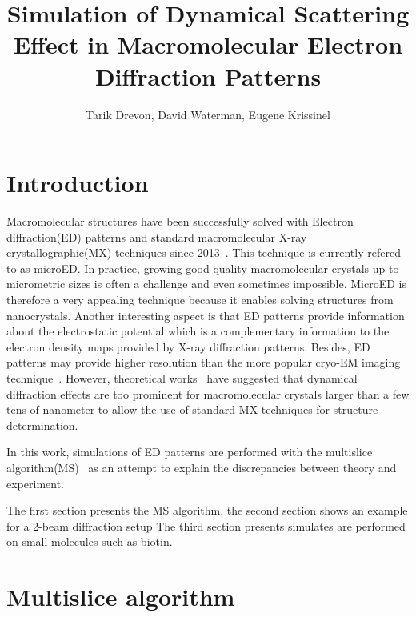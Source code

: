 \documentclass[a4paper,10pt]{article}
\begin{document}
\title{Simulation of Dynamical Scattering Effect in Macromolecular Electron Diffraction Patterns}
\author{Tarik Drevon, David Waterman, Eugene Krissinel}

\maketitle
{}
\tableofcontents




\section{Introduction}
Macromolecular structures have been successfully solved with
Electron diffraction(ED) patterns and standard macromolecular X-ray crystallographic(MX) techniques since 2013~\cite{ShiNanenga2016,ClabbersGrueneAbrahams2017}.
This technique is currently refered to as microED.
In practice, growing good quality macromolecular crystals up to micrometric sizes is often a challenge and even sometimes impossible.
MicroED is therefore a very appealing technique because it enables solving structures from nanocrystals. Another interesting aspect is that ED patterns provide information about the electrostatic potential which is a complementary information to the electron density maps provided by X-ray diffraction patterns. Besides, ED patterns may provide higher resolution than the more popular cryo-EM imaging technique~\cite{Latychevskaia2019}.
However, theoretical works~\cite{GlaeserDowning1993,SubramanianSpence2015} have suggested that dynamical diffraction effects are too prominent for macromolecular crystals larger than a few tens of nanometer to allow the use of standard MX techniques for structure determination.

In this work, simulations of ED patterns are performed with the multislice algorithm(MS)~\cite{CowleyMoodie1957,Ishizuka2004,Kirkland2019} as an
attempt to explain the discrepancies between theory and experiment.

The first section presents the MS algorithm, the second section shows an example for a 2-beam diffraction setup
The third section presents simulates are performed on small molecules such as biotin.


\section{Multislice algorithm}\label{chap:MS}
\end{document}
